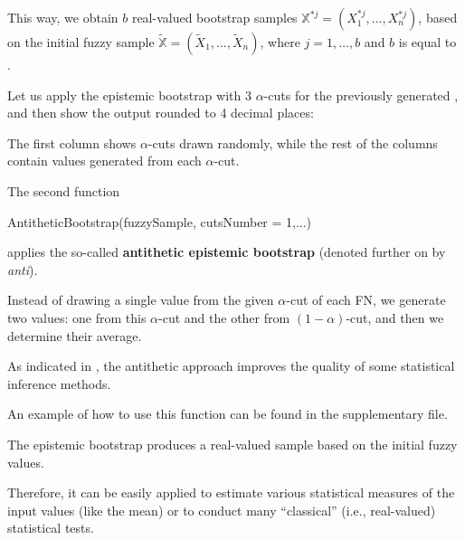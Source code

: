 This way, we obtain $b$ real-valued bootstrap samples $\mathbb{X}^{*j} = \left ( X_1^{*j}, \ldots,  X_n^{*j} \right )$, based on the initial fuzzy sample $\tilde{\mathbb{X}} = ( \tilde{X}_1, \ldots,  \tilde{X}_n)$, where $j=1, \ldots,b$ and $b$ is equal to .

Let us apply the epistemic bootstrap with 3 $\alpha$-cuts for the previously generated , and then show the output rounded to 4 decimal places:


The first column shows $\alpha$-cuts drawn randomly, while the rest of the columns contain values generated from each $\alpha$-cut.

The second function

\begin{example}
AntitheticBootstrap(fuzzySample, cutsNumber = 1,...)
\end{example}

applies the so-called \textbf{antithetic epistemic bootstrap} (denoted further on by \emph{anti}).

Instead of drawing a single value from the given $\alpha$-cut of each FN, we generate two values: one from this $\alpha$-cut and the other from $(1-\alpha)$-cut, and then we determine their average.

As indicated in \cite{10.1007/978-3-031-08974-9_39,pgmr2022}, the antithetic approach improves the quality of some statistical inference methods.

An example of how to use this function can be found in the supplementary file.

The epistemic bootstrap produces a real-valued sample based on the initial fuzzy values.

Therefore, it can be easily applied to estimate various statistical measures of the input values (like the mean) or to conduct many ``classical'' (i.e., real-valued) statistical tests.

